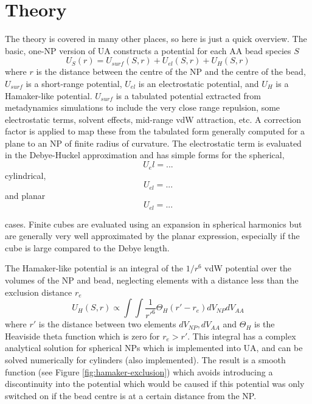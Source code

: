 \documentclass[10pt,a4paper,onecolumn]{report}
\begin{document}
\section{Theory}
The theory is covered in many other places, so here is just a quick overview. The basic, one-NP version of UA constructs a potential for each AA bead species $S$
\begin{equation}
U_S(r) =   U_{surf}(S,r) + U_{el}(S,r) +  U_H(S,r)
\end{equation} 
 where $r$ is the distance between the centre of the NP and the centre of the bead, $U_{surf}$ is a short-range potential, $U_{el}$ is an electrostatic potential, and  $U_H$ is a Hamaker-like potential. $U_{surf}$ is a tabulated potential extracted from metadynamics simulations to include the very close range repulsion, some electrostatic terms, solvent effects, mid-range vdW attraction, etc. A correction factor is applied to map these from the tabulated form generally computed for a plane to an NP of finite radius of curvature. The electrostatic term is evaluated in the Debye-Huckel approximation and has simple forms for the spherical,
 \begin{equation}
 U_el = ...
 \end{equation}
  cylindrical,
 \begin{equation}
 U_{el} = ...
 \end{equation}
and planar
  \begin{equation}
 U_{el} = ...
 \end{equation}

 cases. Finite cubes are evaluated using an expansion in spherical harmonics but are generally very well approximated by the planar expression, especially if the cube is large compared to the Debye length. 

 
 
  The Hamaker-like potential is an integral of the $1/r^6$ vdW potential over the volumes of the NP and bead, neglecting elements with a distance less than the exclusion distance $r_e$
 \begin{equation}
 U_H(S,r) \propto \int \int \frac{1}{r'^6} \Theta_H( r' - r_e)dV_{NP} dV_{AA}
 \end{equation}
 where $r'$ is the distance between two elements $dV_{NP}, dV_{AA}$ and $\Theta_H$ is the Heaviside theta function which is zero for $r_e > r'$. This integral has a complex analytical solution for spherical NPs which is implemented into UA, and can be solved numerically for cylinders (also implemented). The result is a smooth function (see Figure \ref{fig:hamaker-exclusion}) which avoids introducing a discontinuity into the potential which would be caused if this potential was only switched on if the bead centre is at a certain distance from the NP.
 
\end{document}
